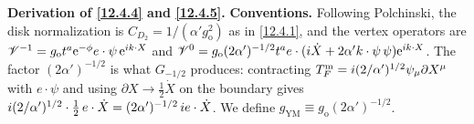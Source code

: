 \begin{tcolorbox}[breakable]
	\begin{remark}
		\textbf{Derivation of \eqref{12.4.4} and \eqref{12.4.5}.} \textbf{Conventions.} Following Polchinski, the disk normalization is $C_{D_2}=1/(\alpha' g_{\mathrm{o}}^{2})$ as in \eqref{12.4.1}, and the vertex operators are $\mathscr{V}^{-1}=g_{\mathrm{o}}t^{a}\mathrm{e}^{-\phi}e\cdot\psi\,\mathrm{e}^{i k\cdot X}$ and $\mathscr{V}^{0}=g_{\mathrm{o}}(2\alpha')^{-1/2}t^{a}e\cdot(i\dot X+2\alpha'k\cdot\psi\,\psi)\mathrm{e}^{i k\cdot X}$. The factor $(2\alpha')^{-1/2}$ is what $G_{-1/2}$ produces: contracting $T_{F}^{\mathrm{m}}=i(2/\alpha')^{1/2}\psi_{\mu}\partial X^{\mu}$ with $e\cdot\psi$ and using $\partial X\to\frac12\dot X$ on the boundary gives $i(2/\alpha')^{1/2}\cdot\frac12\,e\cdot\dot X=(2\alpha')^{-1/2}\,i e\cdot\dot X$. We define $g_{\mathrm{YM}}\equiv g_{\mathrm{o}}(2\alpha')^{-1/2}$.


\end{remark}
\end{tcolorbox}
